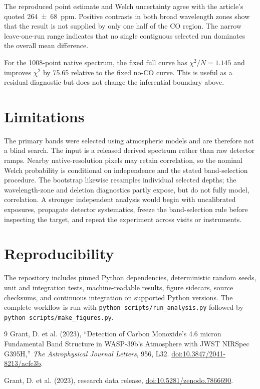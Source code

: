 \documentclass[11pt]{article}
\begin{document}
The reproduced point estimate and Welch uncertainty agree with the article's
quoted \SI{264 +- 68}{ppm}.  Positive contrasts in both broad wavelength
zones show that the result is not supplied by only one half of the CO region.
The narrow leave-one-run range indicates that no single contiguous selected
run dominates the overall mean difference.

For the 1008-point native spectrum, the fixed full curve has
$\chi^2/N=1.145$ and improves $\chi^2$ by 75.65 relative to the fixed no-CO
curve.  This is useful as a residual diagnostic but does not change the
inferential boundary above.

\section{Limitations}
The primary bands were selected using atmospheric models and are therefore
not a blind search.  The input is a released derived spectrum rather than raw
detector ramps.  Nearby native-resolution pixels may retain correlation, so
the nominal Welch probability is conditional on independence and the stated
band-selection procedure.  The bootstrap likewise resamples individual
selected depths; the wavelength-zone and deletion diagnostics partly expose,
but do not fully model, correlation.  A stronger independent analysis would
begin with uncalibrated exposures, propagate detector systematics, freeze the
band-selection rule before inspecting the target, and repeat the experiment
across visits or instruments.

\section{Reproducibility}
The repository includes pinned Python dependencies, deterministic random
seeds, unit and integration tests, machine-readable results, figure sidecars,
source checksums, and continuous integration on supported Python versions.
The complete workflow is run with
\texttt{python scripts/run\_analysis.py} followed by
\texttt{python scripts/make\_figures.py}.

\begin{thebibliography}{9}
Grant, D. et al. (2023), ``Detection of Carbon Monoxide's 4.6 micron
Fundamental Band Structure in WASP-39b's Atmosphere with JWST NIRSpec
G395H,'' \emph{The Astrophysical Journal Letters}, 956, L32.
\href{https://doi.org/10.3847/2041-8213/acfc3b}{doi:10.3847/2041-8213/acfc3b}.

Grant, D. et al. (2023), research data release,
\href{https://doi.org/10.5281/zenodo.7866690}{doi:10.5281/zenodo.7866690}.
\end{thebibliography}
\end{document}
